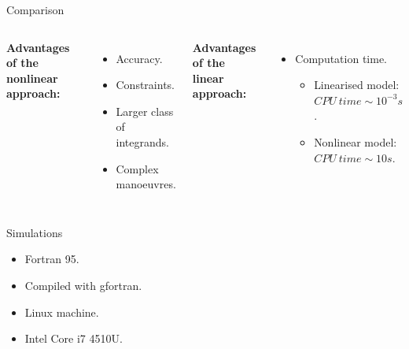 \documentclass{beamer}
\begin{document}
\begin{frame}[t]{Comparison} %
	\begin{columns}
		\begin{center} \textbf{Advantages of the nonlinear approach:} \end{center}
		\begin{itemize}
			\item<2-> Accuracy.
			\item<3-> Constraints.
			\item<4-> Larger class of integrands.
			\item<5-> Complex manoeuvres.
		\end{itemize}
		
		\begin{center} \textbf{Advantages of the linear approach:} \end{center}
		\begin{itemize} 
			\item<6-> Computation time.
			\begin{itemize}
				\item<7-> Linearised model: $CPU\ time \sim 10^{-3}s$.
				\item<7-> Nonlinear model: $CPU\ time \sim 10s$.
			\end{itemize}
		\end{itemize}
	\end{columns}
\end{frame}

\begin{frame}{Simulations} %
	\begin{itemize}
		\item<2-> Fortran 95.
		\item<3-> Compiled with gfortran.
		\item<4-> Linux machine.
		\item<5-> Intel Core i7 4510U.
	\end{itemize}
\end{frame}
\end{document}
